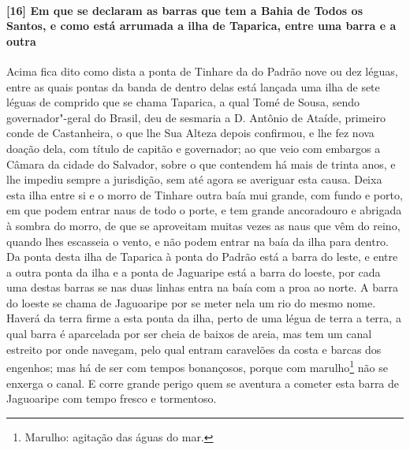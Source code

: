\paragraph{[16] Em que se declaram as barras que tem a Bahia de Todos os Santos, e como está
arrumada a ilha de Taparica, entre uma barra e a outra} \quad
Acima fica dito como dista a ponta de Tinhare da do Padrão nove ou dez léguas, entre as
quais pontas da banda de dentro delas está lançada uma ilha de sete léguas de comprido que
se chama Taparica, a qual Tomé de Sousa, sendo governador"-geral do Brasil, deu de sesmaria
a D. Antônio de Ataíde, primeiro conde de Castanheira, o que lhe Sua Alteza depois
confirmou, e lhe fez nova doação dela, com título de capitão e governador; ao que veio com
embargos a Câmara da cidade do Salvador, sobre o que contendem há mais de trinta anos, e
lhe impediu sempre a jurisdição, sem até agora se averiguar esta causa. Deixa esta ilha
entre si e o morro de Tinhare outra baía mui grande, com fundo e porto, em que podem
entrar naus de todo o porte, e tem grande ancoradouro e abrigada à sombra do morro, de que
se aproveitam muitas vezes as naus que vêm do reino, quando lhes escasseia o vento, e não
podem entrar na baía da ilha para dentro. Da ponta desta ilha de Taparica à ponta do
Padrão está a barra do leste, e entre a outra ponta da ilha e a 
ponta de Jaguaripe está a barra do loeste, por cada uma destas barras se 
nas duas linhas entra na baía com a proa ao norte. A barra do loeste se chama de Jaguoaripe
por se meter nela um rio do mesmo nome. Haverá da terra firme a esta ponta da ilha, perto
de uma légua de terra a terra, a qual barra é aparcelada por ser cheia de baixos de areia,
mas tem um canal estreito por onde navegam, pelo qual entram caravelões da costa e barcas
dos engenhos; mas há de ser com tempos bonançosos, porque com marulho\footnote{ Marulho:
agitação das águas do mar.} não se enxerga o canal. E corre grande perigo quem se aventura
a cometer esta barra de Jaguoaripe com tempo fresco e tormentoso.

